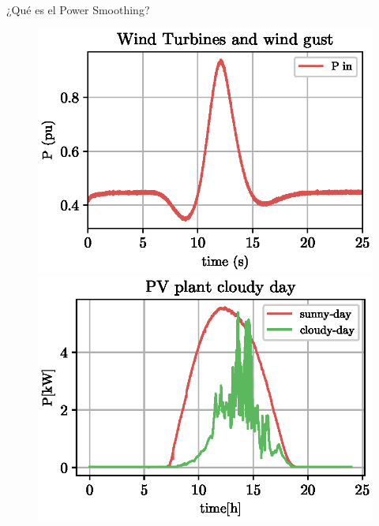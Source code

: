 %
%
\begin{frame}{¿Qué es el Power Smoothing?}
    \begin{figure}
        \centering
        \includegraphics[scale=0.55]{figures/HFPS.eps}
        \includegraphics[scale=0.55]{figures/pv_cloudy-sunny.eps}
    \end{figure}
    
\end{frame}
%
%
